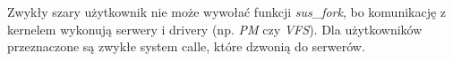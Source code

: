 Zwykły szary użytkownik nie może wywołać funkcji \textit{sus\_fork}, bo komunikację z kernelem wykonują serwery i drivery (np. \textit{PM} czy \textit{VFS}). Dla użytkowników przeznaczone są zwykłe system calle, które dzwonią do serwerów.  
